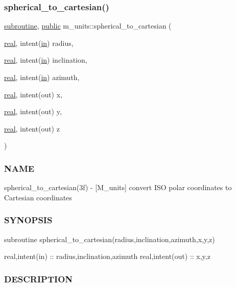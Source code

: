 \subsubsection{\texorpdfstring{spherical\+\_\+to\+\_\+cartesian()}{spherical\_to\_cartesian()}}
{\footnotesize\ttfamily \hyperlink{M__stopwatch_83_8txt_acfbcff50169d691ff02d4a123ed70482}{subroutine}, \hyperlink{M__stopwatch_83_8txt_a2f74811300c361e53b430611a7d1769f}{public} m\+\_\+units\+::spherical\+\_\+to\+\_\+cartesian (\begin{DoxyParamCaption}\item[{\hyperlink{read__watch_83_8txt_abdb62bde002f38ef75f810d3a905a823}{real}, intent(\hyperlink{M__journal_83_8txt_afce72651d1eed785a2132bee863b2f38}{in})}]{radius,  }\item[{\hyperlink{read__watch_83_8txt_abdb62bde002f38ef75f810d3a905a823}{real}, intent(\hyperlink{M__journal_83_8txt_afce72651d1eed785a2132bee863b2f38}{in})}]{inclination,  }\item[{\hyperlink{read__watch_83_8txt_abdb62bde002f38ef75f810d3a905a823}{real}, intent(\hyperlink{M__journal_83_8txt_afce72651d1eed785a2132bee863b2f38}{in})}]{azimuth,  }\item[{\hyperlink{read__watch_83_8txt_abdb62bde002f38ef75f810d3a905a823}{real}, intent(out)}]{x,  }\item[{\hyperlink{read__watch_83_8txt_abdb62bde002f38ef75f810d3a905a823}{real}, intent(out)}]{y,  }\item[{\hyperlink{read__watch_83_8txt_abdb62bde002f38ef75f810d3a905a823}{real}, intent(out)}]{z }\end{DoxyParamCaption})}



\subsubsection*{N\+A\+ME}

spherical\+\_\+to\+\_\+cartesian(3f) -\/ \mbox{[}M\+\_\+units\mbox{]} convert I\+SO polar coordinates to Cartesian coordinates \subsubsection*{S\+Y\+N\+O\+P\+S\+IS}

subroutine spherical\+\_\+to\+\_\+cartesian(radius,inclination,azimuth,x,y,z)

real,intent(in) \+:\+: radius,inclination,azimuth real,intent(out) \+:\+: x,y,z

\subsubsection*{D\+E\+S\+C\+R\+I\+P\+T\+I\+ON}

